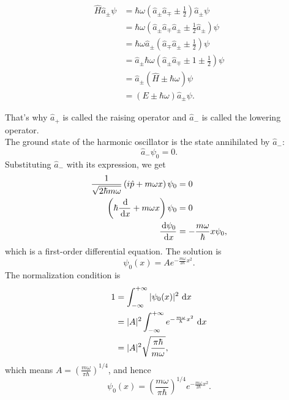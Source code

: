 \documentclass[en, oneside]{vivi}
\begin{document}
\begin{pf}
    \begin{align}
        \hat H \hat a_\pm \psi &= \hbar \omega \left( \hat a_\pm \hat a_\mp \pm \frac{1}{2} \right) \hat a_\pm \psi\\
        &= \hbar \omega \left( \hat a_\pm \hat a_\mp \hat a_\pm \pm \frac{1}{2} \hat a_\pm \right) \psi\\
        &= \hbar \omega \hat a_\pm \left( \hat a_\mp \hat a_\pm \pm \frac{1}{2} \right) \psi\\
        &= \hat a_\pm \hbar \omega \left( \hat a_\pm \hat a_\mp \pm 1 \pm \frac{1}{2} \right) \psi\\
        &= \hat a_\pm (\hat H \pm \hbar \omega) \psi\\
        &= (E \pm \hbar \omega) \hat a_\pm \psi.
    \end{align}
\end{pf}
That's why $\hat a_+$ is called the raising operator and $\hat a_-$ is called the lowering operator.\\
The ground state of the harmonic oscillator is the state annihilated by $\hat a_-$:
\begin{equation}
    \hat a_- \psi_0 = 0.
\end{equation}
Substituting $\hat a_-$ with its expression, we get
\begin{align}
    \frac{1}{\sqrt{2\hbar m \omega}} \left( i \hat p + m \omega x \right) \psi_0 &= 0\\
    \left( \hbar \frac{\dif}{\dif x} + m \omega x \right) \psi_0 &= 0\\
    \frac{\dif \psi_0}{\dif x} &= -\frac{m \omega}{\hbar} x \psi_0,
\end{align}
which is a first-order differential equation. The solution is
\begin{equation}
    \psi_0(x) = A e^{- \frac{m \omega}{2\hbar} x^2}.
\end{equation}
The normalization condition is
\begin{align}
    1 &= \int_{-\infty}^{+\infty} |\psi_0(x)|^2 \dif x\\
    &= |A|^2 \int_{-\infty}^{+\infty} e^{- \frac{m \omega}{\hbar} x^2} \dif x\\
    &= |A|^2 \sqrt{\frac{\pi \hbar}{m \omega}},
\end{align}
which means $A = \left( \frac{m \omega}{\pi \hbar} \right)^{1/4}$, and hence
\begin{equation}
    \psi_0(x) = \left( \frac{m \omega}{\pi \hbar} \right)^{1/4} e^{- \frac{m \omega}{2\hbar} x^2}.
\end{equation}
\end{document}
